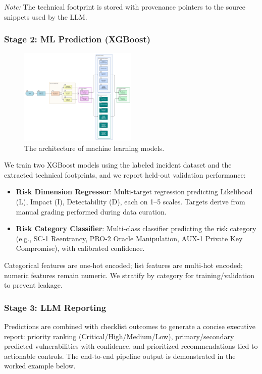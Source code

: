 \begin{multicols}{2}
\textit{Note:} The technical footprint is stored with provenance pointers to the source snippets used by the LLM.

\subsubsection{Stage 2: ML Prediction (XGBoost)}

\begin{figure}[H]
    \centering
    \includegraphics[width=0.5\textwidth]{../figure/methodology/machine_learning.png}
    \caption{The architecture of machine learning models.}
    \label{fig:machine_learning}
\end{figure}

We train two XGBoost models using the labeled incident dataset and the extracted technical footprints, and we report held-out validation performance:
\begin{itemize}
    \item \textbf{Risk Dimension Regressor}: Multi-target regression predicting Likelihood (L), Impact (I), Detectability (D), each on 1--5 scales. Targets derive from manual grading performed during data curation.
    \item \textbf{Risk Category Classifier}: Multi-class classifier predicting the risk category (e.g., SC-1 Reentrancy, PRO-2 Oracle Manipulation, AUX-1 Private Key Compromise), with calibrated confidence.
\end{itemize}
Categorical features are one-hot encoded; list features are multi-hot encoded; numeric features remain numeric. We stratify by category for training/validation to prevent leakage.

\subsubsection{Stage 3: LLM Reporting}
Predictions are combined with checklist outcomes to generate a concise executive report: priority ranking (Critical/High/Medium/Low), primary/secondary predicted vulnerabilities with confidence, and prioritized recommendations tied to actionable controls. The end-to-end pipeline output is demonstrated in the worked example below.


\end{multicols}
